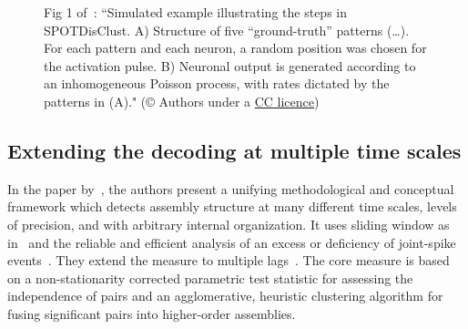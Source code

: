 \documentclass[brainsci, %
               review,submit,pdftex,moreauthors
               ]{Definitions/mdpi}
\begin{document}
\begin{figure}
\centering
\caption{Fig 1 of~\citep{grossberger_unsupervised_2018}: ``Simulated example illustrating the steps in SPOTDisClust. A) Structure of five ``ground-truth'' patterns (\ldots). For each pattern and each neuron, a random position was chosen for the activation pulse. B) Neuronal output is generated according to an inhomogeneous Poisson process, with rates dictated by the patterns in (A)." (© Authors under a \href{https://journals.plos.org/ploscompbiol/article?id=10.1371/journal.pcbi.1006283}{CC licence})}\label{fig:G2018-1}
\end{figure}


\subsection{Extending the decoding at multiple time scales}

In the paper by~\citet{russo_cell_2017}, the authors present a unifying methodological and conceptual framework which detects assembly structure at many different time scales, levels of precision, and with arbitrary internal organization. It uses  sliding window as in~\citep{grun_unitary_2002} and the reliable and efficient analysis of an excess or deficiency of joint-spike events~\citep{pipa_neuroxidence_2008}. They extend the measure to multiple lags~\citep{torre_synchronous_2016}. The core measure is based on a non-stationarity corrected parametric test statistic for assessing the independence of pairs and an agglomerative, heuristic clustering algorithm for fusing significant pairs into higher-order assemblies. 
\end{document}
